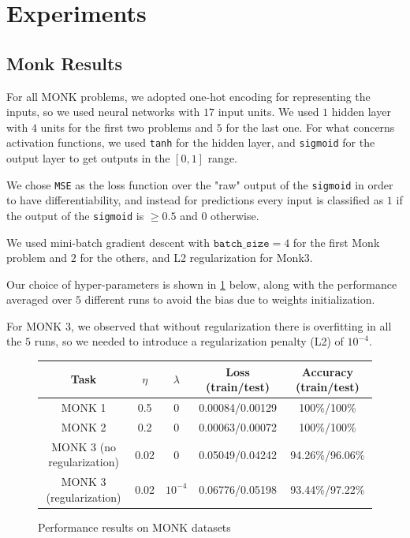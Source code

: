 \section{Experiments}

\subsection{Monk Results}

For all MONK problems, we adopted one-hot encoding for representing the inputs, so we used neural networks with $17$ input units. We used $1$ hidden layer with $4$ units for the first two problems and $5$ for the last one. For what concerns activation functions, we used \texttt{tanh} for the hidden layer, and \texttt{sigmoid} for the output layer to get outputs in the $[0, 1]$ range.

We chose \texttt{MSE} as the loss function over the "raw" output of the \texttt{sigmoid} in order to have differentiability, and instead for predictions every input is classified as $1$ if the output of the \texttt{sigmoid} is $\ge 0.5$ and $0$ otherwise.

We used mini-batch gradient descent with $\texttt{batch\_size} = 4$ for the first Monk problem and $2$ for the others, and L2 regularization for Monk3.

Our choice of hyper-parameters is shown in \cref{fig:hyper} below, along with the performance averaged over $5$ different runs to avoid the bias due to weights initialization.

For MONK 3, we observed that without regularization there is overfitting in all the $5$ runs, so we needed to introduce a regularization penalty (L2) of $10^{-4}$.

\begin{figure}[h]
    \centering
    \begin{tabular}{|c|c|c|c|c|}
        \hline 
        Task & $\eta$ & $\lambda$ & Loss (train/test) & Accuracy (train/test) \\ \hline
        MONK 1 & 0.5 & 0 & 0.00084/0.00129  & 100\%/100\% \\ \hline
        MONK 2 & 0.2 & 0 & 0.00063/0.00072 & 100\%/100\% \\ \hline
        MONK 3 (no regularization) & 0.02 & 0 & 0.05049/0.04242 & 94.26\%/96.06\% \\ \hline
        MONK 3 (regularization) & 0.02 & $10^{-4}$ & 0.06776/0.05198 & 93.44\%/97.22\% \\ \hline
    \end{tabular}
    \caption{Performance results on MONK datasets}
    \label{fig:hyper}
\end{figure}

